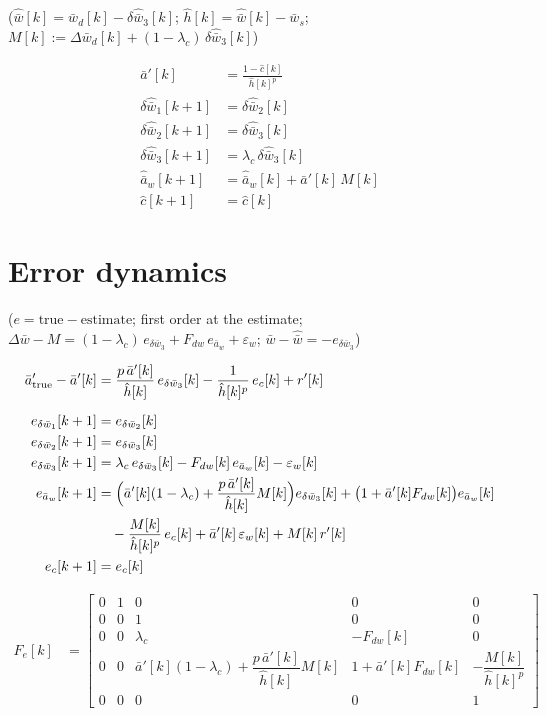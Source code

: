 \documentclass[11pt,a4paper,fontset=none]{ctexart}
\newcommand{\ba}{\bar{a}}
\newcommand{\bw}{\bar{w}}
\newcommand{\dW}{\Delta\bw}
\newcommand{\ap}{\ba'}
\newcommand{\ah}{\hat{\ba}_w}
\newcommand{\wh}{\hat{\bw}}
\newcommand{\hh}{\hat{h}}
\newcommand{\ch}{\hat{c}}
\begin{document}
($\wh[k] = \bw_d[k] - \delta\hat{\bw}_3[k]$; $\hh[k] = \wh[k] - \bw_s$; $M[k] := \Delta\bw_d[k] + (1-\lambda_c)\,\delta\hat{\bw}_3[k]$)

\begin{align*}
\ap[k]                 &= \frac{1 - \ch[k]}{\hh[k]^{p}} \\
\delta\hat{\bw}_1[k+1] &= \delta\hat{\bw}_2[k] \\
\delta\hat{\bw}_2[k+1] &= \delta\hat{\bw}_3[k] \\
\delta\hat{\bw}_3[k+1] &= \lambda_c\,\delta\hat{\bw}_3[k] \\
\ah[k+1]               &= \ah[k] + \ap[k]\,M[k] \\
\ch[k+1]               &= \ch[k]
\end{align*}

\section{Error dynamics}

($e = \text{true} - \text{estimate}$; first order at the estimate; $\dW - M = (1-\lambda_c)\,e_{\delta\bw_3} + F_{dw}\,e_{\ba_w} + \varepsilon_w$; $\bw - \wh = -e_{\delta\bw_3}$)

\begin{align*}
\ap_{\mathrm{true}} - \ap[k] &= \frac{p\,\ap[k]}{\hh[k]}\,e_{\delta\bw_3}[k] - \frac{1}{\hh[k]^{p}}\,e_c[k] + r'[k] \\[6pt]
e_{\delta\bw_1}[k+1] &= e_{\delta\bw_2}[k] \\
e_{\delta\bw_2}[k+1] &= e_{\delta\bw_3}[k] \\
e_{\delta\bw_3}[k+1] &= \lambda_c\,e_{\delta\bw_3}[k] - F_{dw}[k]\,e_{\ba_w}[k] - \varepsilon_w[k] \\
e_{\ba_w}[k+1]       &= \Bigl(\ap[k](1-\lambda_c) + \frac{p\,\ap[k]}{\hh[k]}M[k]\Bigr)e_{\delta\bw_3}[k]
                        + \bigl(1 + \ap[k]F_{dw}[k]\bigr)e_{\ba_w}[k] \\
                     &\quad - \frac{M[k]}{\hh[k]^{p}}\,e_c[k]
                        + \ap[k]\,\varepsilon_w[k] + M[k]\,r'[k] \\
e_c[k+1]             &= e_c[k]
\end{align*}

\begin{align*}
F_e[k] &= \begin{bmatrix}
0 & 1 & 0 & 0 & 0 \\
0 & 0 & 1 & 0 & 0 \\
0 & 0 & \lambda_c & -F_{dw}[k] & 0 \\
0 & 0 & \ap[k](1-\lambda_c) + \dfrac{p\,\ap[k]}{\hh[k]}M[k] & 1 + \ap[k]F_{dw}[k] & -\dfrac{M[k]}{\hh[k]^{p}} \\
0 & 0 & 0 & 0 & 1
\end{bmatrix}
\end{align*}
\end{document}
